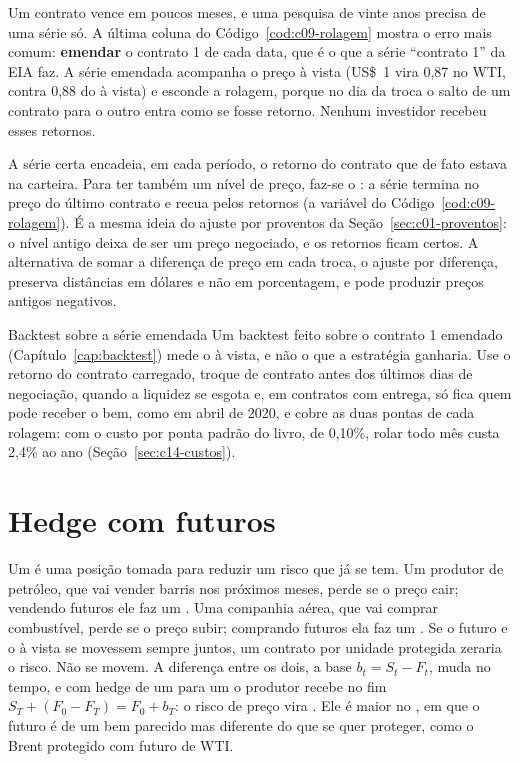 Um contrato vence em poucos meses, e uma pesquisa de vinte anos precisa de uma série só. A última coluna do Código~\ref{cod:c09-rolagem} mostra o erro mais comum: \textbf{emendar} o contrato 1 de cada data, que é o que a série ``contrato 1'' da EIA faz. A série emendada acompanha o preço à vista (US\$~1 vira 0,87 no WTI, contra 0,88 do à vista) e esconde a rolagem, porque no dia da troca o salto de um contrato para o outro entra como se fosse retorno. Nenhum investidor recebeu esses retornos.

A série certa encadeia, em cada período, o retorno do contrato que de fato estava na carteira. Para ter também um nível de preço, faz-se o : a série termina no preço do último contrato e recua pelos retornos (a variável  do Código~\ref{cod:c09-rolagem}). É a mesma ideia do ajuste por proventos da Seção~\ref{sec:c01-proventos}: o nível antigo deixa de ser um preço negociado, e os retornos ficam certos. A alternativa de somar a diferença de preço em cada troca, o ajuste por diferença, preserva distâncias em dólares e não em porcentagem, e pode produzir preços antigos negativos.

\begin{armadilha}{Backtest sobre a série emendada}
Um backtest feito sobre o contrato 1 emendado (Capítulo~\ref{cap:backtest}) mede o à vista, e não o que a estratégia ganharia. Use o retorno do contrato carregado, troque de contrato antes dos últimos dias de negociação, quando a liquidez se esgota e, em contratos com entrega, só fica quem pode receber o bem, como em abril de 2020, e cobre as duas pontas de cada rolagem: com o custo por ponta padrão do livro, de 0,10\%, rolar todo mês custa 2,4\% ao ano (Seção~\ref{sec:c14-custos}).
\end{armadilha}

\section{Hedge com futuros}
\label{sec:c09-hedge}

Um \textbf{} é uma posição tomada para reduzir um risco que já se tem. Um produtor de petróleo, que vai vender barris nos próximos meses, perde se o preço cair; vendendo futuros ele faz um . Uma companhia aérea, que vai comprar combustível, perde se o preço subir; comprando futuros ela faz um . Se o futuro e o à vista se movessem sempre juntos, um contrato por unidade protegida zeraria o risco. Não se movem. A diferença entre os dois, a base $b_t = S_t - F_t$, muda no tempo, e com hedge de um para um o produtor recebe no fim $S_T + (F_0 - F_T) = F_0 + b_T$: o risco de preço vira  \citep[cap.~3]{hull2022}. Ele é maior no , em que o futuro é de um bem parecido mas diferente do que se quer proteger, como o Brent protegido com futuro de WTI.

